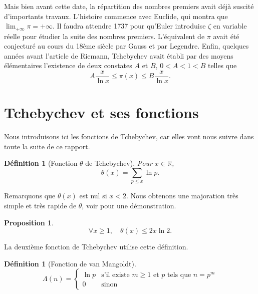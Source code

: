 \documentclass[french]{report}
\newtheorem{definition}[theorem]{Définition}
\newtheorem{proposition}[theorem]{Proposition}
\begin{document}
Mais bien avant cette date, la répartition des nombres premiers avait déjà suscité d'importants travaux. L'histoire commence avec Euclide, qui montra que $\lim_{+\infty}\pi=+\infty$. Il faudra attendre 1737 pour qu'Euler introduise $\zeta$ en variable réelle pour étudier la suite des nombres premiers. L'équivalent de $\pi$ avait été conjecturé au cours du 18ème siècle par Gauss et par Legendre. Enfin, quelques années avant l'article de Riemann, Tchebychev avait établi par des moyens élémentaires l'existence de deux constates $A$ et $B$, $0<A<1<B$ telles que
\[
  A\frac{x}{\ln x}\leq\pi(x)\leq B\frac{x}{\ln x}.
\]

\section{Tchebychev et ses fonctions}

Nous introduisons ici les fonctions de Tchebychev, car elles vont nous suivre dans toute la suite de ce rapport.

\begin{definition}[Fonction $\theta$ de Tchebychev] Pour $x\in \mathbb{R}$,
  \[ \theta(x) = \sum_{p \le x}\ln p. \]
\end{definition}

Remarquons que $\theta(x)$ est nul si $x<2$. Nous obtenons une majoration très simple et très rapide de $\theta$, voir \cite{hindry} pour une démonstration.

\begin{proposition}\label{prop:theta-majoration}
  \[
    \forall x\geq1,\quad \theta(x)\leq 2x\ln 2.
  \]
\end{proposition}

La deuxième fonction de Tchebychev utilise cette définition.

\begin{definition}[Fonction de van Mangoldt]
  \[
    \Lambda(n)=
    \begin{cases}
      \ln p & \text{s'il existe $m\geq1$ et $p$ tels que $n=p^m$} \\
      0 & \text{sinon}
    \end{cases}
  \]
\end{definition}
\end{document}
